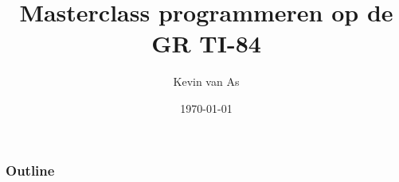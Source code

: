 \documentclass{beamer}
\title{Masterclass programmeren op de GR TI-84}
\author{Kevin van As}
\date{\today}
\begin{document}
\begin{frame}
\titlepage
\end{frame}



\begin{frame}
\frametitle{Outline}
\tableofcontents
\end{frame}

% 
% 



% 
% 
% 
% 
% 
\end{document}
